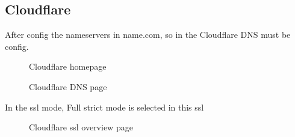 \documentclass[12pt,oneside,openright,a4paper]{cpe-english-project}
\begin{document}
	\subsection{Cloudflare}
		\begin{flushleft}
		After config the nameservers in name.com, so in the Cloudflare DNS must be config.
		\end{flushleft}
		\begin{figure}[!h]\centering
			\caption{Cloudflare homepage}\label{fig:Cloudflare homepage}
		\end{figure}	
		\begin{figure}[!h]\centering
			\caption{Cloudflare DNS page}\label{fig:Cloudflare DNS page}
		\end{figure}
		\pagebreak
		In the ssl mode, Full strict mode is selected in this ssl
		\begin{figure}[!h]\centering
			\caption{Cloudflare ssl overview page}\label{fig:Cloudflare ssl overview page}
		\end{figure}
\end{document}
